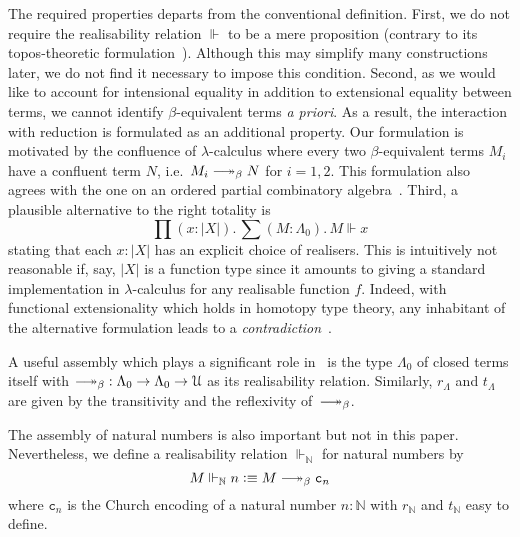 \documentclass[a4paper,UKenglish,numberwithinsect,cleveref,thm-restate]{lipics-v2021}
\newcommand{\Nat}{\mathbb{N}}
\newcommand{\defeq}{\vcentcolon\equiv}
\newcommand{\Univ}{\mathcal{U}}
\DeclareRobustCommand\longtwoheadrightarrow{\relbar\joinrel\twoheadrightarrow}
\newcommand{\reduce}{\longtwoheadrightarrow_{\beta}}
\theoremstyle{plain}
\begin{document}
The required properties departs from the conventional definition. 
First, we do not require the realisability relation $\Vdash$ to be a mere proposition (contrary to its topos-theoretic formulation~\cite{Birkedal2002a}).
Although this may simplify many constructions later, we do not find it necessary to impose this condition.
Second, as we would like to account for intensional equality in addition to extensional equality between terms,
we cannot identify $\beta$-equivalent terms \emph{a priori}.
As a result, the interaction with reduction is formulated as an additional property. 
Our formulation is motivated by the confluence of $\lambda$-calculus where every two $\beta$-equivalent terms $M_i$ have a confluent term $N$, i.e.\ $M_i \reduce N$ for $i = 1, 2$.
This formulation also agrees with the one on an ordered partial combinatory algebra~\cite[Section~2.3]{Hofstra2003}.
Third, a plausible alternative to the right totality is
\[
  \prod (x : |X|).\, \sum (M : \Lambda_0).\, M \Vdash x
\]
stating that each $x : |X|$ has an explicit choice of realisers.
This is intuitively not reasonable if, say, $|X|$ is a function type since it amounts to giving a standard implementation in $\lambda$-calculus for any realisable function $f$.
Indeed, with functional extensionality which holds in homotopy type theory, any inhabitant of the alternative formulation leads to a \emph{contradiction}~\cite{Troelstra1977}. 

\begin{example}
  A useful assembly which plays a significant role in~ is the type $\Lambda_0$ of closed terms itself with ${\reduce} : \Lambda_0 \to \Lambda_0 \to \Univ$ as its realisability relation.
  Similarly, $r_\Lambda$ and $t_\Lambda$ are given by the transitivity and the reflexivity of~$\reduce$.
  
\end{example}

\begin{example}
  The assembly of natural numbers is also important but not in this paper.
  Nevertheless, we define a realisability relation $\Vdash_{\Nat}$ for natural numbers by
  \[
    M \Vdash_\Nat n \defeq M \reduce \mathtt{c}_n
  \]
  where $\mathtt{c}_n$ is the Church encoding of a natural number $n : \Nat$ with $r_\Nat$ and $t_\Nat$ easy to define. 
\end{example}
\end{document}
